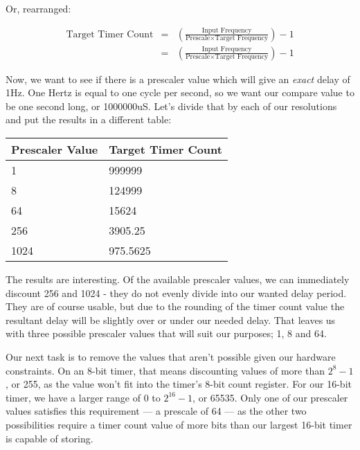 \documentclass[a4paper,oneside,notitlepage]{book}
\begin{document}
Or, rearranged:

\begin{displaymath}
\begin{array}{rcl}
\text{Target Timer Count} & = & (\frac{\text{Input Frequency}}{\text{Prescale} \times \text{Target Frequency}}) - 1 \\[6pt]
                          & = & (\frac{\text{Input Frequency}}{\text{Prescale} \times \text{Target Frequency}}) - 1
\end{array}
\end{displaymath}

Now, we want to see if there is a prescaler value which will give an \textit{exact} delay of 1Hz. One Hertz is equal to one cycle per second, so we want our compare value to be one second long, or 1000000uS. Let's divide that by each of our resolutions and put the results in a different table:

\begin{center}
\begin{tabular}{|l|l|}
	\hline
	Prescaler Value & Target Timer Count \\
	\hline
	1    & 999999   \\
	8    & 124999   \\
	64   & 15624    \\
	256  & 3905.25  \\
	1024 & 975.5625 \\
	\hline
\end{tabular}
\end{center}

The results are interesting. Of the available prescaler values, we can immediately discount 256 and 1024 - they do not evenly divide into our wanted delay period. They are of course usable, but due to the rounding of the timer count value the resultant delay will be slightly over or under our needed delay. That leaves us with three possible prescaler values that will suit our purposes; 1, 8 and 64.

Our next task is to remove the values that aren't possible given our hardware constraints. On an 8-bit timer, that means discounting values of more than \(2^{8}-1\), or 255, as the value won't fit into the timer's 8-bit count register. For our 16-bit timer, we have a larger range of 0 to \(2^{16}-1\), or 65535. Only one of our prescaler values satisfies this requirement --- a prescale of 64 --- as the other two possibilities require a timer count value of more bits than our largest 16-bit timer is capable of storing.
\end{document}
